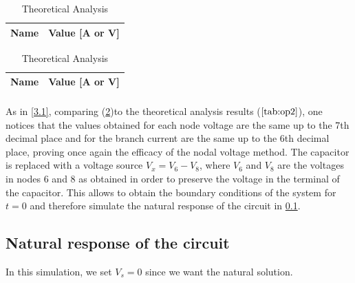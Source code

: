 \begin{table}[!htb]
  \begin{minipage}{0.5\linewidth}
    \centering
    \caption{Simulation Analysis}
    \begin{tabular}{|l|l|}
      \hline
      {\bf Name} & {\bf Value [A or V]} \\ \hline
      
    \end{tabular}
    \label{tab:sim2}
  \end{minipage}%
  \begin{minipage}{.5\linewidth}
    \centering
    \caption{Theoretical Analysis}
    \begin{tabular}{|l|l|}
      \hline
      {\bf Name} & {\bf Value [A or V]} \\ \hline
      
    \end{tabular}
  \end{minipage}
\end{table}

\paragraph{} As in \ref{3.1}, comparing (\ref{tab:sim2})to the theoretical analysis results ($\ref{tab:op2}$), one notices that the values obtained for each
node voltage are the same up to the 7th decimal place and for the branch current are the same up to the 6th
decimal place, proving once again the efficacy of the nodal voltage method. The capacitor is replaced with a voltage
source $V_x = V_6-V_8$, where $V_6$ and $V_8$ are the voltages in nodes 6 and 8 as obtained in order to preserve the voltage
in the terminal of the capacitor. This allows to obtain the boundary conditions of the system for $t=0$ and therefore simulate
the natural response of the circuit in \ref{3.3}.


\subsection{Natural response of the circuit} \label{3.3}

In this simulation, we set $V_s=0$ since we want the natural solution.

